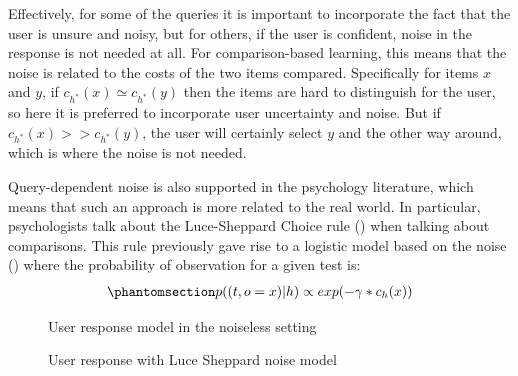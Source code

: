 \documentclass[
  letterpaper,
  numbers=noenddot,
  DIV=11]{scrreprt}
\theoremstyle{definition}
\theoremstyle{plain}
\theoremstyle{plain}
\theoremstyle{remark}
\begin{document}
Effectively, for some of the queries it is important to incorporate the
fact that the user is unsure and noisy, but for others, if the user is
confident, noise in the response is not needed at all. For
comparison-based learning, this means that the noise is related to the
costs of the two items compared. Specifically for items \(x\) and \(y\),
if \(c_{h^*}(x) \simeq c_{h^*}(y)\) then the items are hard to
distinguish for the user, so here it is preferred to incorporate user
uncertainty and noise. But if \(c_{h^*}(x) >> c_{h^*}(y)\), the user
will certainly select \(y\) and the other way around, which is where the
noise is not needed.

Query-dependent noise is also supported in the psychology literature,
which means that such an approach is more related to the real world. In
particular, psychologists talk about the Luce-Sheppard Choice rule
() when talking about comparisons.
This rule previously gave rise to a logistic model based on the noise
() where the
probability of observation for a given test is:
\begin{equation}\phantomsection\label{eq-noise_model}{\begin{aligned}
    p((t, o = x) | h) \propto exp(-\gamma * c_h(x))
\end{aligned}}\end{equation}

\begin{figure}


\caption{\label{fig-noiseless_1}User response model in the noiseless
setting}

\end{figure}%

\begin{figure}


\caption{\label{fig-noiseless_2}User response with Luce Sheppard noise
model}

\end{figure}%
\end{document}
